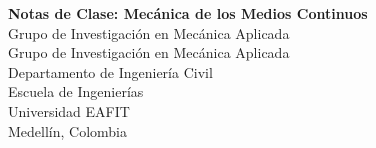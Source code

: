 %
\begin{center}
\vspace{50mm}
\Large{\textbf{Notas de Clase: Mec\'anica de los Medios Continuos}}
\large
\\[50mm]
Grupo de Investigación en Mecánica Aplicada
\\[70mm]
Grupo de Investigaci\'on en Mec\'anica Aplicada
\\
Departamento de Ingeniería Civil
\\
Escuela de Ingenierías
\\
Universidad EAFIT
\\
Medell\'in, Colombia
\\
\the\year
\end{center}
\thispagestyle{empty}